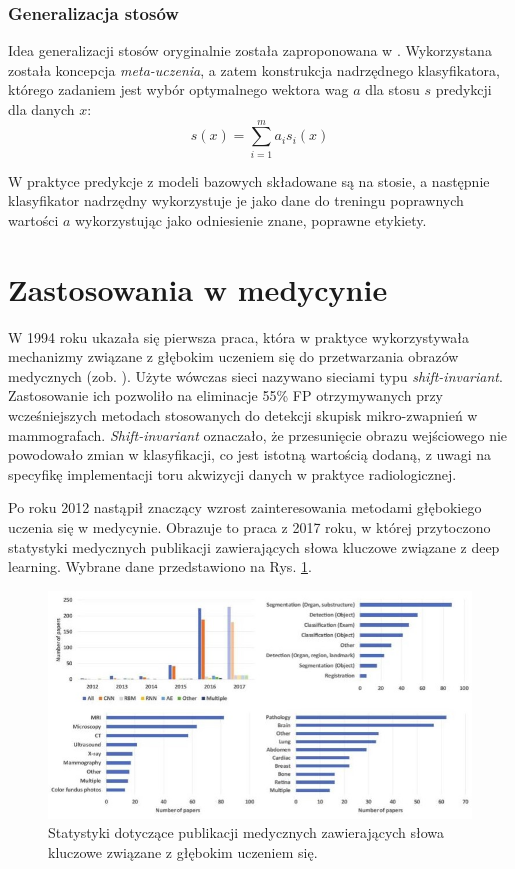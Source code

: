 \subsubsection{Generalizacja stosów}
Idea generalizacji stosów oryginalnie została zaproponowana w \cite{Wolpert92stackedgeneralization}. Wykorzystana została koncepcja \textit{meta-uczenia}, a zatem konstrukcja nadrzędnego klasyfikatora, którego zadaniem jest wybór optymalnego wektora wag $a$ dla stosu $s$ predykcji dla danych $x$:
\begin{equation}
s(x) = \sum_{i=1}^{m}a_i s_i(x)
\end{equation}

W praktyce predykcje z modeli bazowych składowane są na stosie, a następnie klasyfikator nadrzędny wykorzystuje je jako dane do treningu poprawnych wartości $a$ wykorzystując jako odniesienie znane, poprawne etykiety.
 

\section{Zastosowania w medycynie}

W 1994 roku ukazała się pierwsza praca, która w praktyce wykorzystywała mechanizmy związane z głębokim uczeniem się do przetwarzania obrazów medycznych (zob. \cite{Zhang1994}). Użyte wówczas sieci nazywano sieciami typu \textit{shift-invariant}. Zastosowanie ich pozwoliło na eliminacje 55\% FP otrzymywanych przy wcześniejszych metodach stosowanych do detekcji skupisk mikro-zwapnień w mammografach. \textit{Shift-invariant} oznaczało, że przesunięcie obrazu wejściowego nie powodowało zmian w klasyfikacji, co jest istotną wartością dodaną, z uwagi na specyfikę implementacji toru akwizycji danych w praktyce radiologicznej.

Po roku 2012 nastąpił znaczący wzrost zainteresowania metodami głębokiego uczenia się w medycynie. Obrazuje to praca \cite{Litjens2017} z 2017 roku, w której przytoczono statystyki medycznych publikacji zawierających słowa kluczowe związane z deep learning. Wybrane dane przedstawiono na Rys. \ref{DL_CAD_stats}.
\begin{figure}[h!]
	\centering
	\includegraphics[width=1\textwidth]{figures/DL_CAD_statystyka.jpg}
	\caption{Statystyki dotyczące publikacji medycznych zawierających słowa kluczowe związane z głębokim uczeniem się.}
	\label{DL_CAD_stats}
\end{figure}

